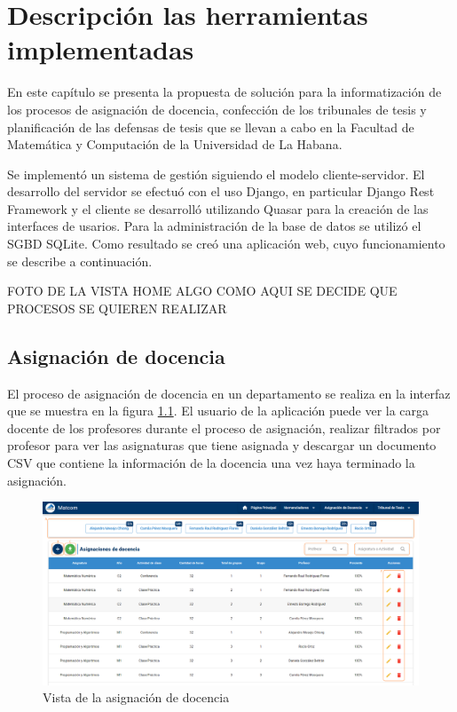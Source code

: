 \chapter{Descripción las herramientas implementadas}\label{chapter:implementation}
En este capítulo se presenta la propuesta de solución para 
la informatización de los procesos de asignación de docencia, confección de los tribunales
de tesis y planificación de las defensas de tesis que se llevan a cabo 
en la Facultad de Matemática y Computación de la Universidad de La Habana. 

Se implementó un sistema de gestión siguiendo el modelo cliente-servidor. El desarrollo del servidor se efectuó con el uso Django, en 
particular Django Rest Framework y el cliente se desarrolló utilizando
Quasar para la creación de las interfaces de usarios. Para la administración de la 
base de datos se utilizó el SGBD SQLite. Como resultado se creó una 
aplicación web, cuyo funcionamiento se describe a continuación.

FOTO DE LA VISTA HOME 
ALGO COMO AQUI SE DECIDE QUE PROCESOS SE QUIEREN REALIZAR




\section{Asignación de docencia}
El proceso de asignación de docencia en un departamento se realiza en la 
interfaz que se muestra en la figura \ref{img-ta-done}. El usuario de la 
aplicación puede ver la carga docente de los profesores durante el proceso 
de asignación, realizar filtrados por profesor para ver las asignaturas 
que tiene asignada y descargar un documento CSV que contiene la información 
de la docencia una vez haya terminado la asignación.


\begin{figure}[H]
    \includegraphics[scale=0.3]{Graphics/Implementation/Docencia/AD-asignada.png}
    \caption{Vista de la asignación de docencia}
    \label{img-ta-done}
\end{figure}


